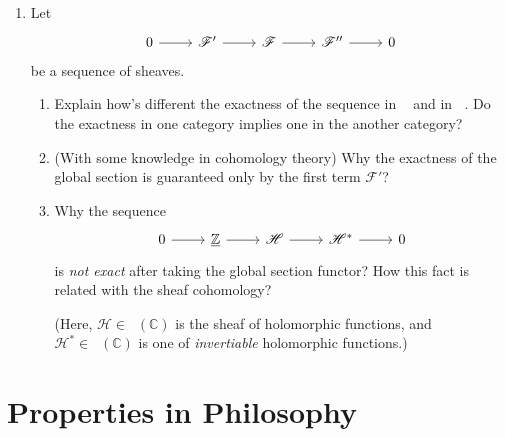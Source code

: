 \documentclass{article}
\theoremstyle{plain}
\theoremstyle{definition}
\DeclareMathOperator{\PSh}{\underline{\textsf{PSh}}}
\DeclareMathOperator{\Sh}{\underline{\textsf{Sh}}}
\begin{document}
\begin{enumerate}[label = \arabic*.]
    \item Let
    \[\begin{tikzcd}
        0 & {\mathscr{F}'} & {\mathscr{F}} & {\mathscr{F}''} & 0
        \arrow[from=1-1, to=1-2]
        \arrow[from=1-2, to=1-3]
        \arrow[from=1-3, to=1-4]
        \arrow[from=1-4, to=1-5]
    \end{tikzcd}\]
    be a sequence of sheaves.
    \begin{enumerate}
        \item Explain how's different the exactness of the sequence in $\Sh$ and in $\PSh$. Do the exactness in one category implies one in the another category?
        \item (With some knowledge in cohomology theory) Why the exactness of the global section is guaranteed only by the first term $\mathscr{F}'$?
        \item Why the sequence
        \[\begin{tikzcd}
            0 & {\underline{\mathbb{Z}}} & {\mathscr{H}} & {\mathscr{H}^\ast} & 0
            \arrow[from=1-1, to=1-2]
            \arrow[from=1-2, to=1-3]
            \arrow[from=1-3, to=1-4]
            \arrow[from=1-4, to=1-5]
        \end{tikzcd}\]
        is \emph{not exact} after taking the global section functor? How this fact is related with the sheaf cohomology?
        
        (Here, $\mathscr{H} \in \Sh(\mathbb{C})$ is the sheaf of holomorphic functions, and $\mathscr{H}^\ast \in \Sh(\mathbb{C})$ is one of \emph{invertiable} holomorphic functions.)
    \end{enumerate}
\end{enumerate}

\newpage

\section*{Properties in Philosophy}
\end{document}
